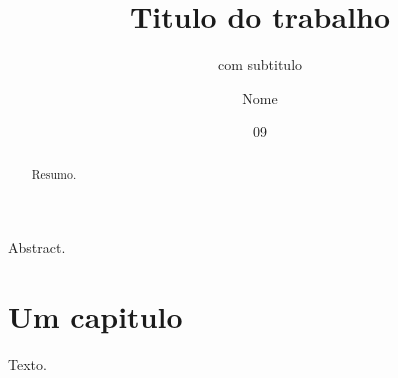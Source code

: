 \documentclass[dsc]{ufrj}
\title{Titulo do trabalho}
\subtitle{com subtitulo}
\author{Nome}{Sobrenome}
\date{09}{2026}
\begin{document}
  \maketitle
  \frontmatter
  \begin{abstract}Resumo.\end{abstract}
  \begin{foreignabstract}Abstract.\end{foreignabstract}
  \tableofcontents
  \mainmatter
  \chapter{Um capitulo}
  Texto.
\end{document}
